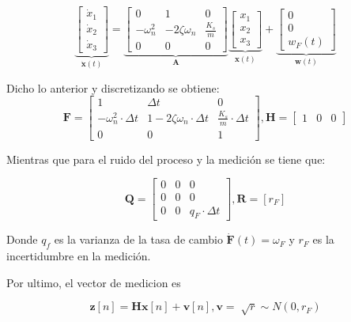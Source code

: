 \documentclass[conference]{IEEEtran}
\begin{document}
\begin{equation*}
	\underbrace{
		\begin{bmatrix}
			\dot{x}_1 \\
			\dot{x}_2 \\
			\dot{x}_3
		\end{bmatrix}
	}_{\mathbf{\dot{x}}(t)}
	=
	\underbrace{\begin{bmatrix}
			0           & 1                & 0 \\
			-\omega_n^2 & -2\zeta\omega_n  &  \frac{K_s}{m} \\
			0			& 0				   & 0
	\end{bmatrix}}_{\mathbf{A}}
	\underbrace{\begin{bmatrix}
			x_1 \\
			x_2 \\
			x_3
	\end{bmatrix}}_{\mathbf{x}(t)}	
	+
	\underbrace{
	\begin{bmatrix}
		0 \\
		0 \\
		w_{F}(t)
	\end{bmatrix}
	}_{\mathbf{w}(t)}	
\end{equation*}

Dicho lo anterior y discretizando se obtiene:
\[
\mathbf{F} = 
\begin{bmatrix}
	1           & \Delta t            & 0 \\
	-\omega_n^2 \cdot \Delta t   & 1 -2\zeta\omega_n \cdot \Delta t   &  \frac{K_s}{m} \cdot \Delta t  \\
	0			& 0				   & 1
\end{bmatrix}, 
\mathbf{H} = 
\begin{bmatrix}
	1 & 0 & 0
\end{bmatrix}
\]


Mientras que para el ruido del proceso y la medición se tiene que:


\[
\mathbf{Q} =  \begin{bmatrix}
	0   & 0    & 0 \\
	0   & 0    & 0  \\
	0   & 0	   & q_F \cdot \Delta t
\end{bmatrix}, \mathbf{R} = [r_F]
\]

Donde $q_f$ es la varianza de la tasa de cambio $\mathbf{\dot{F}}(t) = \omega_{F}$ y $r_F$ es la incertidumbre en la medici\'on.

Por ultimo, el vector de medicion es

\[
\textbf{z}[n] = \textbf{H} \textbf{x}[n] + \textbf{v}[n] ,
\mathbf{v} = \sqrt[]{r}\sim N (0,r_F)
\]
\end{document}
